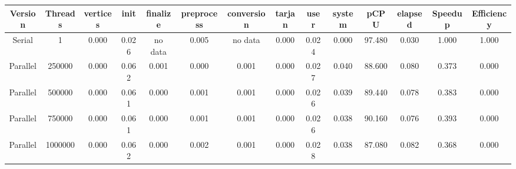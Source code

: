 \begin{tabular}{|c|c|c|c|c|c|c|c|c|c|c|c|c|c|}
\toprule
 Version &  Threads &    vertices &  init & finalize &  preprocess & conversion &  tarjan &  user &  system &   pCPU &  elapsed &  Speedup &  Efficiency \\
\midrule
  Serial &        1 &    0.000 & 0.026 &  no data &       0.005 &    no data &   0.000 & 0.024 &   0.000 & 97.480 &    0.030 &    1.000 &       1.000 \\
Parallel &   250000 &    0.000 & 0.062 &    0.001 &       0.000 &      0.001 &   0.000 & 0.027 &   0.040 & 88.600 &    0.080 &    0.373 &       0.000 \\
Parallel &   500000 &    0.000 & 0.061 &    0.000 &       0.001 &      0.001 &   0.000 & 0.026 &   0.039 & 89.440 &    0.078 &    0.383 &       0.000 \\
Parallel &   750000 &    0.000 & 0.061 &    0.000 &       0.001 &      0.001 &   0.000 & 0.026 &   0.038 & 90.160 &    0.076 &    0.393 &       0.000 \\
Parallel &  1000000 &    0.000 & 0.062 &    0.000 &       0.002 &      0.001 &   0.000 & 0.028 &   0.038 & 87.080 &    0.082 &    0.368 &       0.000 \\
\bottomrule
\end{tabular}
